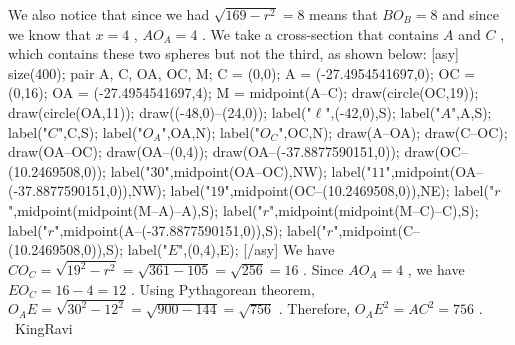 \documentclass[12pt]{article}
\begin{document}
We also notice that since we had $\sqrt{169-r^2} = 8$ means that $BO_B = 8$ and since we know that $x = 4$ , $AO_A = 4$ . We take a cross-section that contains $A$ and $C$ , which contains these two spheres but not the third, as shown below: [asy] size(400); pair A, C, OA, OC, M; C = (0,0); A = (-27.4954541697,0); OC = (0,16); OA = (-27.4954541697,4); M = midpoint(A--C); draw(circle(OC,19)); draw(circle(OA,11)); draw((-48,0)--(24,0)); label("$\ell$",(-42,0),S); label("$A$",A,S); label("$C$",C,S); label("$O_A$",OA,N); label("$O_C$",OC,N); draw(A--OA); draw(C--OC); draw(OA--OC); draw(OA--(0,4)); draw(OA--(-37.8877590151,0)); draw(OC--(10.2469508,0)); label("$30$",midpoint(OA--OC),NW); label("$11$",midpoint(OA--(-37.8877590151,0)),NW); label("$19$",midpoint(OC--(10.2469508,0)),NE); label("$r$",midpoint(midpoint(M--A)--A),S); label("$r$",midpoint(midpoint(M--C)--C),S); label("$r$",midpoint(A--(-37.8877590151,0)),S); label("$r$",midpoint(C--(10.2469508,0)),S); label("$E$",(0,4),E); [/asy] We have $CO_C = \sqrt{19^2-r^2} = \sqrt{361 - 105} = \sqrt{256} = 16$ . Since $AO_A = 4$ , we have $EO_C = 16-4 = 12$ . Using Pythagorean theorem, $O_AE = \sqrt{30^2 - 12^2} = \sqrt{900-144} = \sqrt{756}$ . Therefore, $O_AE^2 = AC^2 = \boxed{756}$ . ~KingRavi
\end{document}
